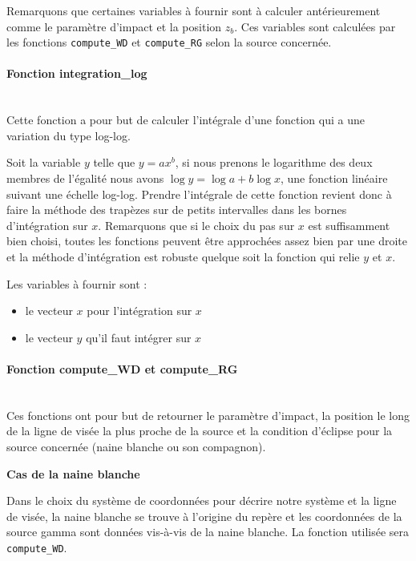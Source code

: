 \documentclass[a4paper,12pt,twoside]{article}
\begin{document}
\begin{appendices}
Remarquons que certaines variables à fournir sont à calculer antérieurement comme le paramètre d'impact et la position $z_b$. Ces variables sont calculées par les fonctions \texttt{compute\_WD} et \texttt{compute\_RG} selon la source concernée.

\paragraph*{Fonction integration\_log} \hspace{0pt} \\

Cette fonction a pour but de calculer l'intégrale d'une fonction qui a une variation du type log-log.

Soit la variable $y$ telle que $y = a x^b$, si nous prenons le logarithme des deux membres de l'égalité nous avons $\log y = \log a + b \log x$, une fonction linéaire suivant une échelle log-log. Prendre l'intégrale de cette fonction revient donc à faire la méthode des trapèzes sur de petits intervalles dans les bornes d'intégration sur $x$. Remarquons que si le choix du pas sur $x$ est suffisamment bien choisi, toutes les fonctions peuvent être approchées assez bien par une droite et la méthode d'intégration est robuste quelque soit la fonction qui relie $y$ et $x$.

Les variables à fournir sont :
\begin{itemize}
	\item le vecteur $x$ pour l'intégration sur $x$
    \item le vecteur $y$ qu'il faut intégrer sur $x$
\end{itemize}

\paragraph*{Fonction compute\_WD et compute\_RG} \hspace{0pt} \\

Ces fonctions ont pour but de retourner le paramètre d'impact, la position le long de la ligne de visée la plus proche de la source et la condition d'éclipse pour la source concernée (naine blanche ou son compagnon).

\textbf{Cas de la naine blanche}

Dans le choix du système de coordonnées pour décrire notre système et la ligne de visée, la naine blanche se trouve à l'origine du repère et les coordonnées de la source gamma sont données vis-à-vis de la naine blanche. La fonction utilisée sera \texttt{compute\_WD}.


\end{appendices}
\end{document}
